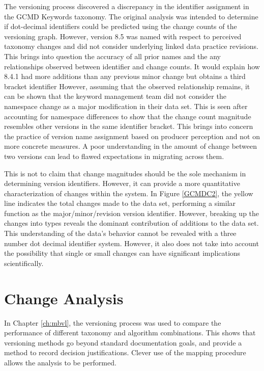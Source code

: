 The versioning process discovered a discrepancy in the identifier assignment in the GCMD Keywords taxonomy.
The original analysis was intended to determine if dot-decimal identifiers could be predicted using the change counts of the versioning graph.
However, version 8.5 was named with respect to perceived taxonomy changes and did not consider underlying linked data practice revisions.
This brings into question the accuracy of all prior names and the any relationships observed between identifier and change counts.
It would explain how 8.4.1 had more additions than any previous minor change but obtains a third bracket identifier
However, assuming that the observed relationship remains, it can be shown that the keyword management team did not consider the namespace change as a major modification in their data set.
This is seen after accounting for namespace differences to show that the change count magnitude resembles other versions in the same identifier bracket.
This brings into concern the practice of version name assignment based on producer perception and not on more concrete measures.
A poor understanding in the amount of change between two versions can lead to flawed expectations in migrating across them.

This is not to claim that change magnitudes should be the sole mechanism in determining version identifiers.
However, it can provide a more quantitative characterization of changes within the system.
In Figure \ref{GCMDC2}, the yellow line indicates the total changes made to the data set, performing a similar function as the major/minor/revision version identifier.
However, breaking up the changes into types reveals the dominant contribution of additions to the data set.
This understanding of the data's behavior cannot be revealed with a three number dot decimal identifier system.
However, it also does not take into account the possibility that single or small changes can have significant implications scientifically.

\section{Change Analysis}

In Chapter \ref{ch:mbvl}, the versioning process was used to compare the performance of different taxonomy and algorithm combinations.
This shows that versioning methods go beyond standard documentation goals, and provide a method to record decision justifications.
Clever use of the mapping procedure allows the analysis to be performed.